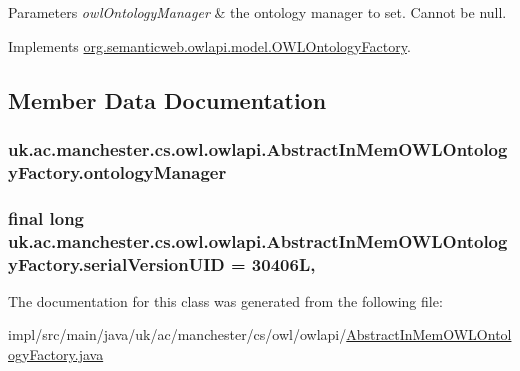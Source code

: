 \begin{DoxyParams}{Parameters}
{\em owl\-Ontology\-Manager} & the ontology manager to set. Cannot be null. \\
\hline
\end{DoxyParams}


Implements \hyperlink{interfaceorg_1_1semanticweb_1_1owlapi_1_1model_1_1_o_w_l_ontology_factory_abf3b97bacdcf053f307cd800fc538a21}{org.\-semanticweb.\-owlapi.\-model.\-O\-W\-L\-Ontology\-Factory}.



\subsection{Member Data Documentation}
\hypertarget{classuk_1_1ac_1_1manchester_1_1cs_1_1owl_1_1owlapi_1_1_abstract_in_mem_o_w_l_ontology_factory_a975223cfd3a3acaf399ffcf36b8750c4}{
\subsubsection[{ontology\-Manager}]{ uk.\-ac.\-manchester.\-cs.\-owl.\-owlapi.\-Abstract\-In\-Mem\-O\-W\-L\-Ontology\-Factory.\-ontology\-Manager\hspace{0.3cm}{\ttfamily [private]}}}\label{classuk_1_1ac_1_1manchester_1_1cs_1_1owl_1_1owlapi_1_1_abstract_in_mem_o_w_l_ontology_factory_a975223cfd3a3acaf399ffcf36b8750c4}
\hypertarget{classuk_1_1ac_1_1manchester_1_1cs_1_1owl_1_1owlapi_1_1_abstract_in_mem_o_w_l_ontology_factory_a9d28d9314a19f0cb4c391ad705abf200}{
\subsubsection[{serial\-Version\-U\-I\-D}]{\setlength{\rightskip}{0pt plus 5cm}final long uk.\-ac.\-manchester.\-cs.\-owl.\-owlapi.\-Abstract\-In\-Mem\-O\-W\-L\-Ontology\-Factory.\-serial\-Version\-U\-I\-D = 30406\-L\hspace{0.3cm}{\ttfamily [static]}, {\ttfamily [private]}}}\label{classuk_1_1ac_1_1manchester_1_1cs_1_1owl_1_1owlapi_1_1_abstract_in_mem_o_w_l_ontology_factory_a9d28d9314a19f0cb4c391ad705abf200}


The documentation for this class was generated from the following file\-:\begin{DoxyCompactItemize}
\item 
impl/src/main/java/uk/ac/manchester/cs/owl/owlapi/\hyperlink{_abstract_in_mem_o_w_l_ontology_factory_8java}{Abstract\-In\-Mem\-O\-W\-L\-Ontology\-Factory.\-java}\end{DoxyCompactItemize}
